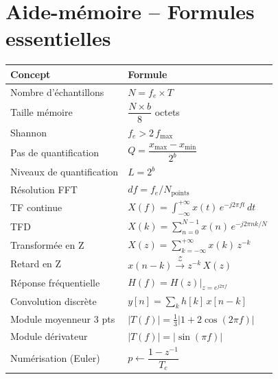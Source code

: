 \documentclass[12pt,a4paper]{article}
\newcommand{\TZ}{\mathcal{Z}}
\begin{document}
\newpage
\section{Aide-mémoire -- Formules essentielles}

\begin{tcolorbox}[formbox, title=Tout en un -- Formules à maîtriser]
\renewcommand{\arraystretch}{1.8}
\begin{tabular}{@{}p{5cm}p{9cm}@{}}
\toprule
\textbf{Concept} & \textbf{Formule} \\
\midrule
Nombre d'échantillons & $N = f_e \times T$ \\
Taille mémoire & $\dfrac{N \times b}{8}$ octets \\
Shannon & $f_e > 2\,f_{\max}$ \\
Pas de quantification & $Q = \dfrac{x_{\max}-x_{\min}}{2^b}$ \\
Niveaux de quantification & $L = 2^b$ \\
Résolution FFT & $df = f_e / N_{\text{points}}$ \\[6pt]
TF continue & $X(f) = \int_{-\infty}^{+\infty} x(t)\,e^{-j2\pi ft}\,dt$ \\[6pt]
TFD & $X(k) = \sum_{n=0}^{N-1} x(n)\,e^{-j2\pi nk/N}$ \\[6pt]
Transformée en Z & $X(z) = \sum_{k=-\infty}^{+\infty} x(k)\,z^{-k}$ \\[6pt]
Retard en Z & $x(n-k) \xrightarrow{\TZ} z^{-k}\,X(z)$ \\[6pt]
Réponse fréquentielle & $H(f) = H(z)\big|_{z=e^{j2\pi f}}$ \\[6pt]
Convolution discrète & $y[n] = \sum_k h[k]\,x[n-k]$ \\[6pt]
Module moyenneur 3 pts & $|T(f)| = \tfrac{1}{3}|1+2\cos(2\pi f)|$ \\[6pt]
Module dérivateur & $|T(f)| = |\sin(\pi f)|$ \\[6pt]
Numérisation (Euler) & $p \leftarrow \dfrac{1-z^{-1}}{T_e}$ \\
\bottomrule
\end{tabular}
\end{tcolorbox}

\end{document}
